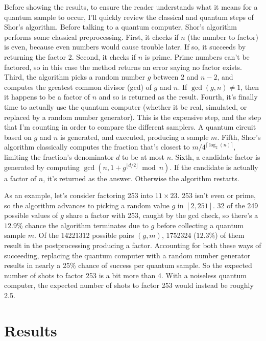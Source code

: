 \documentclass{article}
\begin{document}
Before showing the results, to ensure the reader understands what it means for a quantum sample to occur, I'll quickly review the classical and quantum steps of Shor's algorithm.
Before talking to a quantum computer, Shor's algorithm performs some classical preprocessing.
First, it checks if $n$ (the number to factor) is even, because even numbers would cause trouble later.
If so, it succeeds by returning the factor 2.
Second, it checks if $n$ is prime.
Prime numbers can't be factored, so in this case the method returns an error saying no factor exists.
Third, the algorithm picks a random number $g$ between $2$ and $n-2$, and computes the greatest common divisor (gcd) of $g$ and $n$.
If $\gcd(g, n) \neq 1$, then it happens to be a factor of $n$ and so is returned as the result.
Fourth, it's finally time to actually use the quantum computer (whether it be real, simulated, or replaced by a random number generator).
This is the expensive step, and the step that I'm counting in order to compare the different samplers.
A quantum circuit based on $g$ and $n$ is generated, and executed, producing a sample $m$.
Fifth, Shor's algorithm classically computes the fraction that's closest to $m/4^{\lceil \log_2(n) \rceil}$, limiting the fraction's denominator $d$ to be at most $n$.
Sixth, a candidate factor is generated by computing $\gcd(n, 1 + g^{\lfloor d / 2 \rfloor} \bmod n)$.
If the candidate is actually a factor of $n$, it's returned as the answer.
Otherwise the algorithm restarts.

As an example, let's consider factoring 253 into $11 \times 23$.
253 isn't even or prime, so the algorithm advances to picking a random value $g$ in $[2, 251]$.
32 of the 249 possible values of $g$ share a factor with 253, caught by the gcd check, so there's a $12.9\%$ chance the algorithm terminates due to $g$ before collecting a quantum sample $m$.
Of the 14221312 possible pairs $(g, m)$, 1752324 ($12.3\%$) of them result in the postprocessing producing a factor.
Accounting for both these ways of succeeding, replacing the quantum computer with a random number generator results in nearly a 25\% chance of success per quantum sample.
So the expected number of shots to factor 253 is a bit more than 4.
With a noiseless quantum computer, the expected number of shots to factor 253 would instead be roughly 2.5.


\section{Results}
\end{document}
